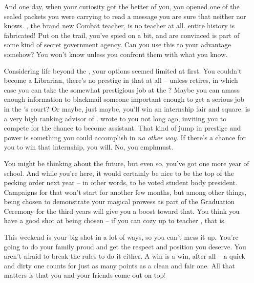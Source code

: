 \documentclass[char]{GL2020}
\begin{document}
And one day, when your curiosity got the better of you, you opened one of the sealed packets you were carrying to read a message you are sure that neither \cEthics{} nor \cChupSecond{} knows. \cInterpol{}, the brand new Combat teacher, is no teacher at all. \cInterpol{\Their} entire history is fabricated! Put on the trail, you've spied on \cInterpol{} a bit, and are convinced \cInterpol{} is part of some kind of secret government agency. Can you use this to your advantage somehow? You won't know unless you confront them with what you know.

Considering life beyond the \pSc{}, your options seemed limited at first. You couldn't become a Librarian, there's no prestige in that at all -- unless \cLibrarian{} retires, in which case you can take the somewhat prestigious job at the \pSc{}? Maybe you can amass enough information to blackmail someone important enough to get a serious job in the \cQueen{\Majesty}'s court? Or maybe, just maybe, you'll win an internship fair and square. \cEvil{} is a very high ranking advisor of \cQueen{\Majesty} \cQueen{}. \cEvil{\They} wrote to you not long ago, inviting you to compete for the chance to become \cEvil{\their} assistant. That kind of jump in prestige and power is something you could accomplish in \emph{no other way}. If there's a chance for you to win that internship, you will. No, you emph{must}.

You might be thinking about the future, but even so, you've got one more year of school. And while you're here, it would certainly be nice to be the top of the pecking order next year -- in other words, to be voted student body president. Campaigns for that won't start for another few months, but among other things, being chosen to demonstrate your magical prowess as part of the Graduation Ceremony for the third years will give you a boost toward that. You think you have a good shot at being chosen -- if you can cozy up to teacher \cMusic{}, that is.

This weekend is your big shot in a lot of ways, so you can't mess it up. You're going to do your family proud and get the respect and position you deserve. You aren't afraid to break the rules to do it either. A win is a win, after all -- a quick and dirty one counts for just as many points as a clean and fair one. All that matters is that you and your friends come out on top!
\end{document}

